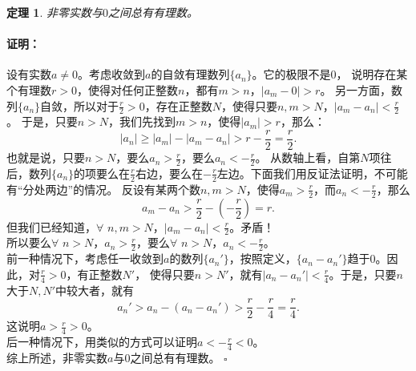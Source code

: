 \documentclass[12pt,UTF8]{ctexbook}
\newtheorem{tm}{定理}[section]
\renewenvironment{proof}{\paragraph{\textbf{证明：}}}{\hfill$\square$}
\begin{document}
\begin{appendix}
\begin{tm}\label{tm:a-1-18}
    非零实数与$0$之间总有有理数。
\end{tm}
\begin{proof}
    设有实数$a\neq 0$。考虑收敛到$a$的自敛有理数列$\{a_n\}$。它的极限不是$0$，
    说明存在某个有理数$r>0$，使得对任何正整数$n$，都有$m>n$，$|a_m - 0| > r$。
    另一方面，数列$\{a_n\}$自敛，所以对于$\frac{r}{2} > 0$，存在正整数$N$，使得只要$n,m>N$，$|a_m - a_n| < \frac{r}{2}$。
    于是，只要$n>N$，我们先找到$m>n$，使得$|a_m| > r$，那么：
    $$  |a_n| \geqslant |a_m| - |a_m - a_n| > r - \frac{r}{2} = \frac{r}{2}. $$
    也就是说，只要$n>N$，要么$a_n > \frac{r}{2}$，要么$a_n < -\frac{r}{2}$。
    从数轴上看，自第$N$项往后，数列$\{a_n\}$的项要么在$\frac{r}{2}$右边，要么在$-\frac{r}{2}$左边。下面我们用反证法证明，不可能有“分处两边”的情况。
    反设有某两个数$n,m>N$，使得$a_m > \frac{r}{2}$，而$a_n < -\frac{r}{2}$，那么
    $$a_m - a_n > \frac{r}{2} - (-\frac{r}{2}) = r.$$
    但我们已经知道，$\forall \,\,n,m>N$，$|a_m - a_n| < \frac{r}{2}$。矛盾！\\
    所以要么$\forall\,\, n>N$，$a_n > \frac{r}{2}$，要么$\forall\,\, n>N$，$a_n < -\frac{r}{2}$。\\
    前一种情况下，考虑任一收敛到$a$的数列$\{a_n'\}$，按照定义，$\{a_n - a_n'\}$趋于$0$。因此，对$ \frac{r}{4} > 0$，有正整数$N'$，
    使得只要$n>N'$，就有$|a_n - a_n'| < \frac{r}{4}$。于是，只要$n$大于$N,N'$中较大者，就有
    $$ a_n' > a_n - (a_n - a_n') > \frac{r}{2} - \frac{r}{4} = \frac{r}{4}.$$
    这说明$a > \frac{r}{4} > 0$。\\
    后一种情况下，用类似的方式可以证明$a < -\frac{r}{4} < 0$。\\
    综上所述，非零实数$a$与$0$之间总有有理数。
\end{proof}


\end{appendix}
\end{document}
